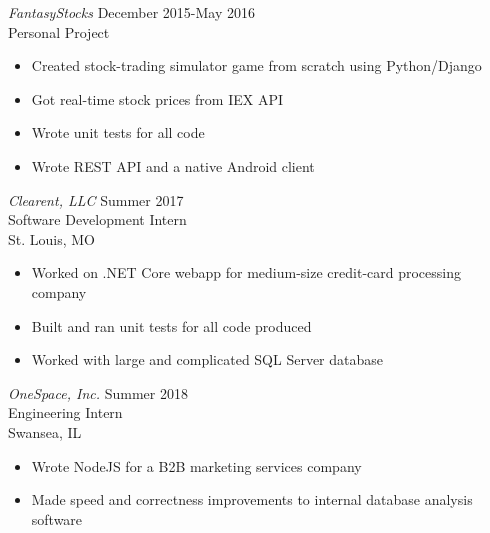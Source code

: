 \documentclass[margin]{res}
\begin{document}
\begin{resume}
             {\sl FantasyStocks} \hfill December 2015-May 2016 \\
             Personal Project 
            \begin{itemize} \itemsep -2pt %
                \item Created stock-trading simulator game from scratch using Python/Django
                \item Got real-time stock prices from IEX API
                \item Wrote unit tests for all code
                \item Wrote REST API and a native Android client
            \end{itemize}
 
                {\sl Clearent, LLC } \hfill            Summer 2017 \\
                Software Development Intern \\
                St. Louis, MO
                 \begin{itemize}  \itemsep -2pt %
                 \item Worked on .NET Core webapp for medium-size credit-card processing company
                 \item Built and ran unit tests for all code produced
                 \item Worked with large and complicated SQL Server database
                 \end{itemize} 

                {\sl OneSpace, Inc.} \hfill        Summer 2018 \\
                Engineering Intern \\
                Swansea, IL
                \begin{itemize} \itemsep -2pt %
                    \item Wrote NodeJS for a B2B marketing services company
                    \item Made speed and correctness improvements to internal database analysis software
                \end{itemize} 


\end{resume}
\end{document}

